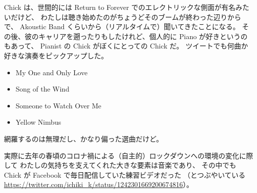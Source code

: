 \documentclass[dvipdfmx,autodetect-engine,10pt,b5paper,papersize,openany,dvipsnames]{jsbook}
\begin{document}
\begin{multicols}{2}
Chick は、世間的には Return to Forever でのエレクトリックな側面が有名みたいだけど、
わたしは聴き始めたのがちょうどそのブームが終わった辺りからで、
Akoustic Band くらいから（リアルタイムで）聞いてきたことになる。
その後、彼のキャリアを遡ったりもしたけれど、個人的に Piano が好きというのもあって、
Pianist の Chick がぼくにとっての Chick だ。
ツイートでも何曲か好きな演奏をピックアップした。
\begin{itemize}
\item My One and Only Love
\item Song of the Wind
\item Someone to Watch Over Me
\item Yellow Nimbus
\end{itemize}
網羅するのは無理だし、かなり偏った選曲だけど。


\vspace{10cm}


実際に去年の春頃のコロナ禍による（自主的）ロックダウンへの環境の変化に際して
わたしの気持ちを支えてくれた大きな要素は音楽であり、
その中でも Chick が Facebook で毎日配信していた練習ビデオだった
（とつぶやいている
\url{https://twitter.com/ichiki_k/status/1242301669200674816}）。


\end{multicols}
\end{document}

